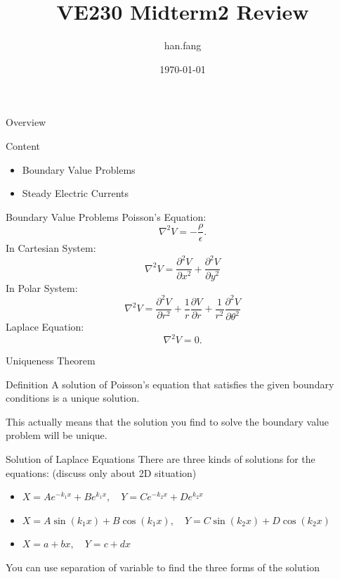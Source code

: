 \documentclass[xcolor={dvipsnames}]{beamer}
\title[VE230 Midterm2 Review]{VE230 Midterm2 Review}
\author{han.fang }
\date{\today}
\begin{document}
\begin{frame}
\titlepage
\end{frame}
\begin{frame}{Overview}
\begin{block}{Content}
	\begin{itemize}
		\item Boundary Value Problems
		\item Steady Electric Currents
	\end{itemize}
\end{block}
\end{frame}

\begin{frame}{Boundary Value Problems}
Poisson's Equation:
$$\nabla^2 V=-\frac{\rho}{\epsilon}.$$
In Cartesian System:
$$\nabla^2 V=\frac{\partial^2 V}{\partial x^2}+\frac{\partial^2 V}{\partial y^2}$$
In Polar System:
$$\nabla^2 V=\frac{\partial^2 V}{\partial r^2}+\frac{1}{r}\frac{\partial V}{\partial r}+\frac{1}{r^2}\frac{\partial^2 V}{\partial \theta^2}$$
Laplace Equation:
$$\nabla^2 V=0.$$
\end{frame}
\begin{frame}{Uniqueness Theorem}
\begin{block}{Definition}
A solution of Poisson’s equation that satisfies the given boundary conditions is a unique solution.
\end{block}
This actually means that the solution you find to solve the boundary value problem will be unique.
\end{frame}
\begin{frame}{Solution of Laplace Equations}
There are three kinds of solutions for the equations: (discuss only about 2D situation) 
\begin{itemize}
	\item $X=Ae^{-k_1x}+Be^{k_1x},\quad Y=Ce^{-k_2x}+De^{k_2x}$
	\item $X=A\sin(k_1x)+B\cos(k_1x),\quad Y=C\sin(k_2x)+D\cos(k_2x)$
	\item $X=a+bx,\quad Y=c+dx$
\end{itemize}
You can use separation of variable to find the three forms of the solution
\end{frame}
\end{document}
